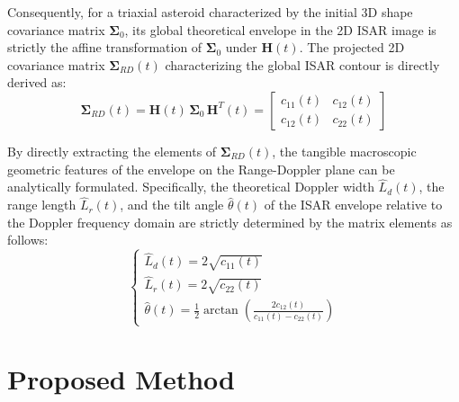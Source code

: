 \documentclass[conference]{IEEEtran}
\begin{document}
Consequently, for a triaxial asteroid characterized by the initial 3D shape covariance matrix $\mathbf{\Sigma}_0$, its global theoretical envelope in the 2D ISAR image is strictly the affine transformation of $\mathbf{\Sigma}_0$ under $\mathbf{H}(t)$. The projected 2D covariance matrix $\mathbf{\Sigma}_{RD}(t)$ characterizing the global ISAR contour is directly derived as:
\begin{equation}
	\mathbf{\Sigma}_{RD}(t) = \mathbf{H}(t)\,\mathbf{\Sigma}_0\,\mathbf{H}^T(t) =
	\begin{bmatrix}
		c_{11}(t) & c_{12}(t) \\
		c_{12}(t) & c_{22}(t)
	\end{bmatrix}
\end{equation}

By directly extracting the elements of $\mathbf{\Sigma}_{RD}(t)$, the tangible macroscopic geometric features of the envelope on the Range-Doppler plane can be analytically formulated. Specifically, the theoretical Doppler width $\hat{L}_{d}(t)$, the range length $\hat{L}_{r}(t)$, and the tilt angle $\hat{\theta}(t)$ of the ISAR envelope relative to the Doppler frequency domain are strictly determined by the matrix elements as follows:
\begin{equation}
	\begin{cases}
		\hat{L}_{d}(t) = 2\sqrt{c_{11}(t)} \\
		\hat{L}_{r}(t) = 2\sqrt{c_{22}(t)} \\
		\hat{\theta}(t) = \frac{1}{2} \arctan \left( \frac{2 c_{12}(t)}{c_{11}(t) - c_{22}(t)} \right)
	\end{cases}
\end{equation}

\section{Proposed Method}\label{sec_three}

\end{document}

